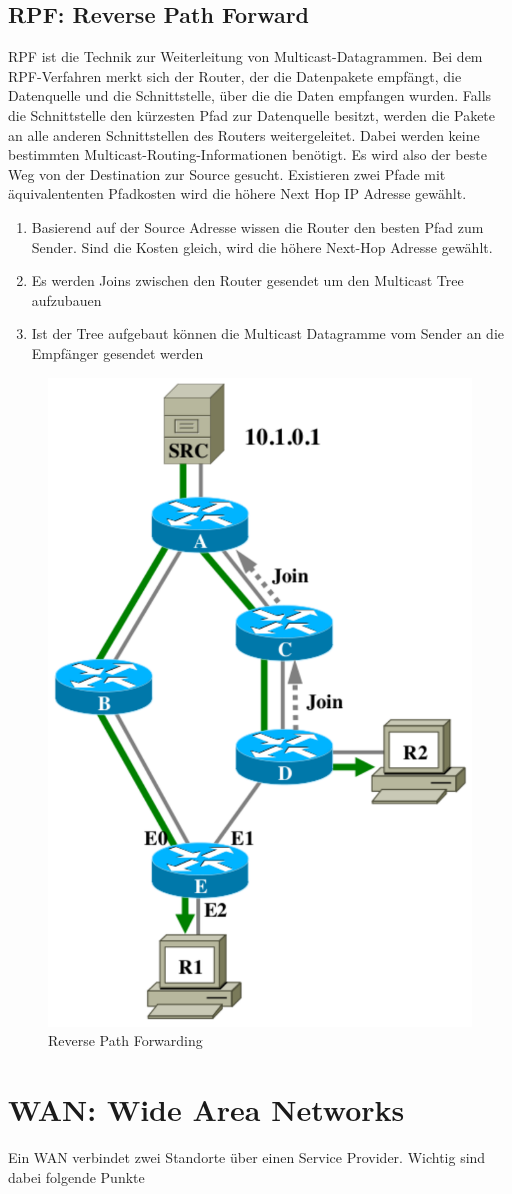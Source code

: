 \subsection{RPF: Reverse Path Forward}
RPF ist die Technik zur Weiterleitung von Multicast-Datagrammen. Bei dem RPF-Verfahren merkt sich der Router, der die Datenpakete empfängt, die Datenquelle und die Schnittstelle, über die die Daten empfangen wurden. Falls die Schnittstelle den kürzesten Pfad zur Datenquelle besitzt, werden die Pakete an alle anderen Schnittstellen des Routers weitergeleitet. Dabei werden keine bestimmten Multicast-Routing-Informationen benötigt. Es wird also der beste Weg von der Destination zur Source gesucht. Existieren zwei Pfade mit äquivalententen Pfadkosten wird die höhere Next Hop IP Adresse gewählt.

\begin{enumerate}
	\item Basierend auf der Source Adresse wissen die Router den besten Pfad zum Sender. Sind die Kosten gleich, wird die höhere Next-Hop Adresse gewählt. 
	\item Es werden Joins zwischen den Router gesendet um den Multicast Tree aufzubauen
	\item Ist der Tree aufgebaut können die Multicast Datagramme vom Sender an die Empfänger gesendet werden
\end{enumerate}

\begin{figure}[h]
\centering
\includegraphics[width=0.3\linewidth]{images/rpf}
\caption{Reverse Path Forwarding}
\end{figure}

\section{WAN: Wide Area Networks}
Ein WAN verbindet zwei Standorte über einen Service Provider. Wichtig sind dabei folgende Punkte

